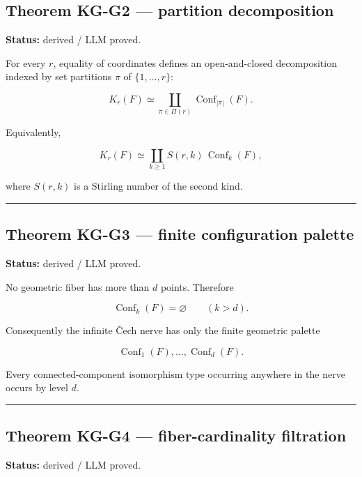 \subsection{Theorem KG-G2 --- partition
decomposition}\label{theorem-kg-g2-partition-decomposition}

\textbf{Status:} derived / LLM proved.

For every \(r\), equality of coordinates defines an open-and-closed
decomposition indexed by set partitions \(\pi\) of \(\{1,\ldots,r\}\):

\[
K_r(F)
\simeq
\coprod_{\pi\in\Pi(r)}
\operatorname{Conf}_{|\pi|}(F).
\]

Equivalently,

\[
K_r(F)
\simeq
\coprod_{k\ge1}
S(r,k)\,\operatorname{Conf}_k(F),
\]

where \(S(r,k)\) is a Stirling number of the second kind.

\begin{center}\rule{0.5\linewidth}{0.5pt}\end{center}

\subsection{Theorem KG-G3 --- finite configuration
palette}\label{theorem-kg-g3-finite-configuration-palette}

\textbf{Status:} derived / LLM proved.

No geometric fiber has more than \(d\) points. Therefore

\[
\operatorname{Conf}_k(F)=\varnothing\qquad(k>d).
\]

Consequently the infinite Čech nerve has only the finite geometric
palette

\[
\operatorname{Conf}_1(F),\ldots,\operatorname{Conf}_d(F).
\]

Every connected-component isomorphism type occurring anywhere in the
nerve occurs by level \(d\).

\begin{center}\rule{0.5\linewidth}{0.5pt}\end{center}

\subsection{Theorem KG-G4 --- fiber-cardinality
filtration}\label{theorem-kg-g4-fiber-cardinality-filtration}

\textbf{Status:} derived / LLM proved.

